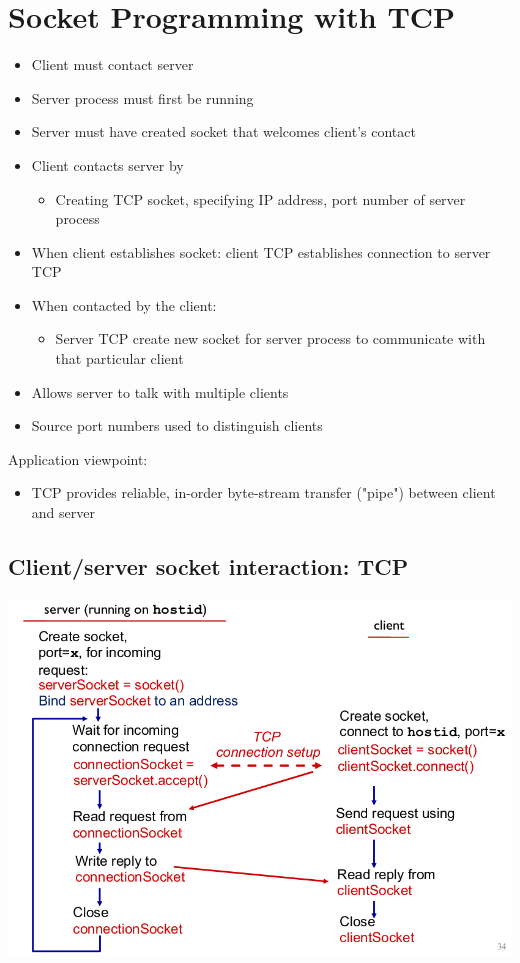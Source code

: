 \documentclass{article}[18pt]
\begin{document}
\section{Socket Programming with TCP}
\begin{itemize}
	\item Client must contact server
	\item Server process must first be running
	\item Server must have created socket that welcomes client's contact
	\item Client contacts server by
	\begin{itemize}
		\item Creating TCP socket, specifying IP address, port number of server process
	\end{itemize}
	\item When client establishes socket: client TCP establishes connection to server TCP
	\item When contacted by the client:
	\begin{itemize}
		\item Server TCP create new socket for server process to communicate with that particular client
	\end{itemize}
	\item Allows server to talk with multiple clients
	\item Source port numbers used to distinguish clients
\end{itemize}
Application viewpoint:
\begin{itemize}
	\item TCP provides reliable, in-order byte-stream transfer ("pipe") between client and server
\end{itemize}
\subsection{Client/server socket interaction: TCP}
\begin{center}
	\includegraphics[scale=0.5]{TCP}
\end{center}
\end{document}
